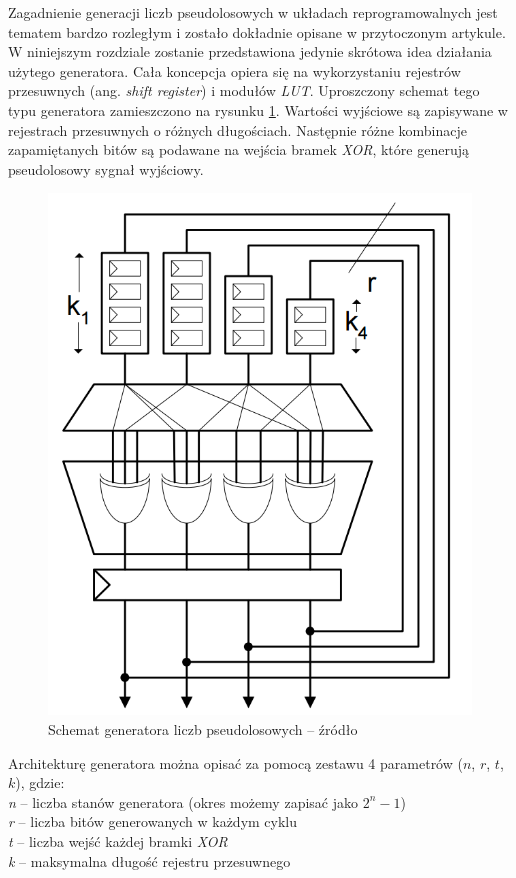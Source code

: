 Zagadnienie generacji liczb pseudolosowych w układach reprogramowalnych jest tematem bardzo rozległym i zostało dokładnie opisane w przytoczonym artykule. 
W niniejszym rozdziale zostanie przedstawiona jedynie skrótowa idea działania użytego generatora. 
Cała koncepcja opiera się na wykorzystaniu rejestrów przesuwnych (ang. \textit{shift register}) i modułów \textit{LUT}. %
Uproszczony schemat tego typu generatora zamieszczono na rysunku \ref{fig:fpga_rng}. 
Wartości wyjściowe są zapisywane w rejestrach przesuwnych o różnych długościach. 
Następnie różne kombinacje zapamiętanych bitów są podawane na wejścia bramek \textit{XOR}, które generują pseudolosowy sygnał wyjściowy.

	\begin{figure}[h!]
        \centering
		\includegraphics[scale=0.3]{img/4/rng_scheme.png}
		\caption{Schemat generatora liczb pseudolosowych -- źródło \cite{thomas_10}}
		\label{fig:fpga_rng}
	\end{figure}

Architekturę generatora można opisać za pomocą zestawu 4 parametrów ($n$, $r$, $t$, $k$), gdzie:\\
\-\hspace{1cm} \textit{n} -- liczba stanów generatora (okres możemy zapisać jako $2^n-1$)\\
\-\hspace{1cm} \textit{r} -- liczba bitów generowanych w każdym cyklu\\
\-\hspace{1cm} \textit{t} -- liczba wejść każdej bramki \textit{XOR}\\
\-\hspace{1cm} \textit{k} -- maksymalna długość rejestru przesuwnego\\


